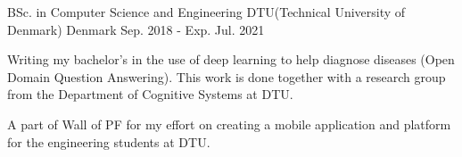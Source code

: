 

\begin{cventries}

  \cventry
    {BSc. in Computer Science and Engineering} %
    {DTU(Technical University of Denmark)} %
    {Denmark} %
    {Sep. 2018 - Exp. Jul. 2021} %
    {
      \begin{cvitems} %
      	\item {Writing my bachelor's in the use of deep learning to help diagnose diseases (Open Domain Question Answering). This work is done together with a research group from the Department of Cognitive Systems at DTU.}
        \item {A part of Wall of PF for my effort on creating a mobile application and platform for the engineering students at DTU.}
      \end{cvitems}
    }

\end{cventries}
